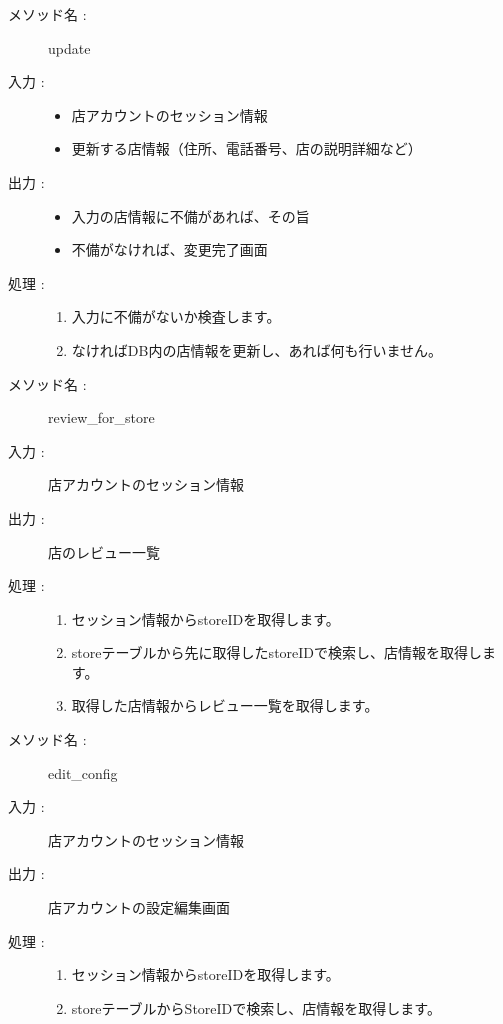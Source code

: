 \documentclass[a4j,titlepage]{jarticle}
\begin{document}
\clearpage

\begin{description}
  \item [メソッド名 :] update
  \item [入力 :]\mbox{}
  \begin{itemize}
    \item 店アカウントのセッション情報
    \item 更新する店情報（住所、電話番号、店の説明詳細など）
  \end{itemize}
  \item [出力 :]\mbox{}
  \begin{itemize}
    \item 入力の店情報に不備があれば、その旨
    \item 不備がなければ、変更完了画面
  \end{itemize}
  \item [処理 :]\mbox{}
  \begin{enumerate}
    \item 入力に不備がないか検査します。
    \item なければDB内の店情報を更新し、あれば何も行いません。
  \end{enumerate}
\end{description}

\begin{description}
  \item [メソッド名 :] review\_for\_store
  \item [入力 :] 店アカウントのセッション情報
  \item [出力 :] 店のレビュー一覧
  \item [処理 :]\mbox{}
  \begin{enumerate}
    \item セッション情報からstoreIDを取得します。
    \item storeテーブルから先に取得したstoreIDで検索し、店情報を取得します。
    \item 取得した店情報からレビュー一覧を取得します。
  \end{enumerate}
\end{description}

\begin{description}
  \item [メソッド名 :] edit\_config
  \item [入力 :] 店アカウントのセッション情報
  \item [出力 :] 店アカウントの設定編集画面
  \item [処理 :]\mbox{}
  \begin{enumerate}
    \item セッション情報からstoreIDを取得します。
    \item storeテーブルからStoreIDで検索し、店情報を取得します。
  \end{enumerate}
\end{description}
\end{document}

